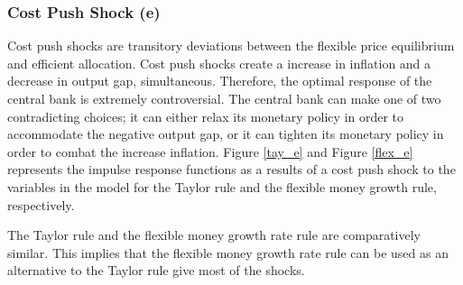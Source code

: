 \documentclass[11pt,preprint, authoryear]{elsarticle}
\numberwithin{equation}{section}
\numberwithin{figure}{section}
\numberwithin{table}{section}
\begin{document}
\hypertarget{cost-push-shock-e}{%
\subsubsection{Cost Push Shock (e)}\label{cost-push-shock-e}}

Cost push shocks are transitory deviations between the flexible price
equilibrium and efficient allocation. Cost push shocks create a increase
in inflation and a decrease in output gap, simultaneous. Therefore, the
optimal response of the central bank is extremely controversial. The
central bank can make one of two contradicting choices; it can either
relax its monetary policy in order to accommodate the negative output
gap, or it can tighten its monetary policy in order to combat the
increase inflation. Figure \ref{tay_e} and Figure \ref{flex_e}
represents the impulse response functions as a results of a cost push
shock to the variables in the model for the Taylor rule and the flexible
money growth rule, respectively.

The Taylor rule and the flexible money growth rate rule are
comparatively similar. This implies that the flexible money growth rate
rule can be used as an alternative to the Taylor rule give most of the
shocks.
\end{document}
